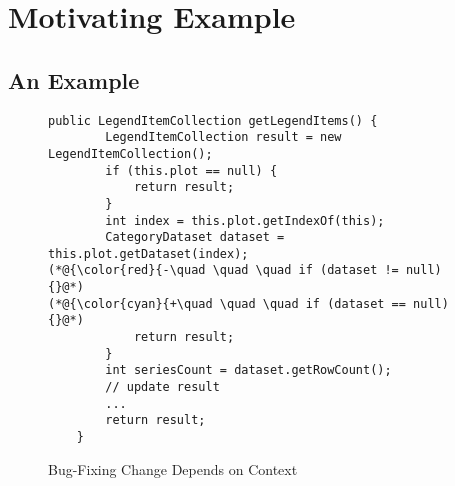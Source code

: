 \section{Motivating Example}
\label{motiv:sec}

\subsection{An Example}

\begin{figure}[t]
	\centering
	\begin{lstlisting}[]
    public LegendItemCollection getLegendItems() {
        LegendItemCollection result = new LegendItemCollection();
        if (this.plot == null) {
            return result;
        }
        int index = this.plot.getIndexOf(this);
        CategoryDataset dataset = this.plot.getDataset(index);
(*@{\color{red}{-\quad \quad \quad if (dataset != null) {}@*)
(*@{\color{cyan}{+\quad \quad \quad if (dataset == null) {}@*)
            return result;
        }
        int seriesCount = dataset.getRowCount();
        // update result
        ...
        return result;
    }
	\end{lstlisting}
        \vspace{-15pt}
        \caption{Bug-Fixing Change Depends on Context}
        \vspace{-8pt}
        \label{fig:motiv}
\end{figure}



